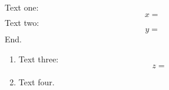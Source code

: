 \documentclass{article}
\begin{document}
Text one:
\[ x = \]
Text two:
\[ y = \]
End.

\begin{enumerate}
\item\leavevmode{}Text three:
\[ z = \]
\item\leavevmode{}Text four.
\end{enumerate}
\end{document}
